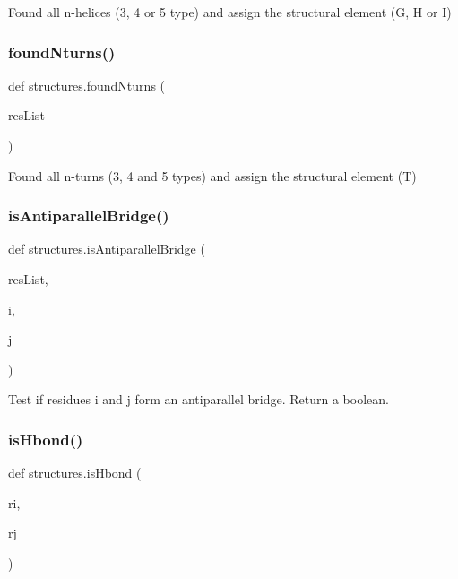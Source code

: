 \begin{DoxyVerb}Found all n-helices (3, 4 or 5 type) and assign the structural element (G, H or I)\end{DoxyVerb}
 \mbox{\label{namespacestructures_a795926583fcdcef561a4e8d6b7376a91}} 
\subsubsection{\texorpdfstring{found\+Nturns()}{foundNturns()}}
{\footnotesize\ttfamily def structures.\+found\+Nturns (\begin{DoxyParamCaption}\item[{}]{res\+List }\end{DoxyParamCaption})}

\begin{DoxyVerb}Found all n-turns (3, 4 and 5 types) and assign the structural element (T)\end{DoxyVerb}
 \mbox{\label{namespacestructures_a09c19e5e3eb8cc345f18e4f25bc92452}} 
\subsubsection{\texorpdfstring{is\+Antiparallel\+Bridge()}{isAntiparallelBridge()}}
{\footnotesize\ttfamily def structures.\+is\+Antiparallel\+Bridge (\begin{DoxyParamCaption}\item[{}]{res\+List,  }\item[{}]{i,  }\item[{}]{j }\end{DoxyParamCaption})}

\begin{DoxyVerb}Test if residues i and j form an antiparallel bridge. Return a boolean.\end{DoxyVerb}
 \mbox{\label{namespacestructures_aa576adcabf417d4dfd322b5d51ec882d}} 
\subsubsection{\texorpdfstring{is\+Hbond()}{isHbond()}}
{\footnotesize\ttfamily def structures.\+is\+Hbond (\begin{DoxyParamCaption}\item[{}]{ri,  }\item[{}]{rj }\end{DoxyParamCaption})}



